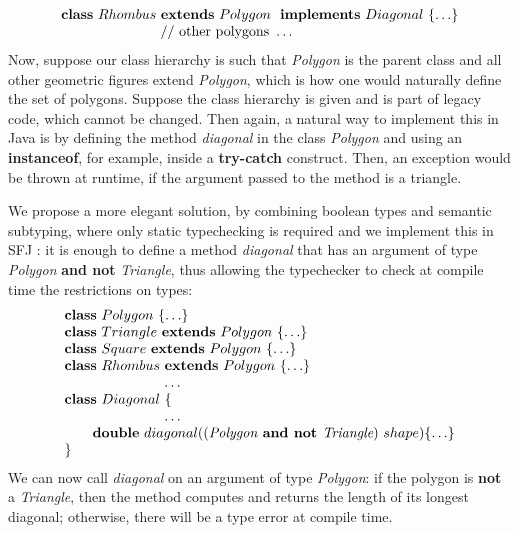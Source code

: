 \documentclass[runningheads]{llncs}
\begin{document}
\begin{example}[Polygons]
\begin{equation*}
\begin{array}{l}
            \mathbf{class} \  Rhombus \ \mathbf{extends }\  Polygon\  \ \mathbf{implements}\  Diagonal \ \{\ldots\}
            \\
            \hspace{2.5cm} // \text{ other polygons } \ldots
        \end{array}
    \end{equation*}
    Now, suppose our class hierarchy is such that \emph{Polygon} is the parent class and all other geometric figures extend \emph{Polygon}, which is how one would naturally define the set of polygons.
    Suppose the class hierarchy is given and is part of legacy code, which cannot be changed.
    Then again, a natural way to implement this in Java is by defining the method \emph{diagonal} in the class \emph{Polygon} and using an \textbf{instanceof}, for example, inside a \textbf{try-catch} construct.
    Then, an exception would be thrown at runtime, if the argument passed to the method is a triangle.

    We propose a more elegant solution, by combining boolean types and semantic subtyping, where only static typechecking is required and we implement this in SFJ \cite{UD20}: it is enough to define a method \emph{diagonal} that has an argument of type \emph{Polygon} \textbf{and not} \emph{Triangle}, thus allowing the typechecker to check at compile time the restrictions on types:
    \begin{equation*}
        \begin{array}{l}
            \mathbf{class} \  Polygon \ \{\ldots\}
            \\
            \mathbf{class} \  Triangle \ \mathbf{extends }\  Polygon\ \{\ldots\}
            \\
            \mathbf{class} \  Square \ \mathbf{extends }\  Polygon\ \{\ldots\}
            \\
            \mathbf{class} \  Rhombus \ \mathbf{extends }\  Polygon\ \{\ldots\}
            \\
            \hspace{2.5cm} \ldots
            \\
            \mathbf{class} \  Diagonal \ \{
            \\
            \hspace{2.5cm} \ldots \\
            \qquad \mathbf{double}\ diagonal((\textit{Polygon} \textbf{ and not }  \textit{Triangle}) \ shape)\{\ldots\}
            \\
            \}
        \end{array}
    \end{equation*}
    We can now call \emph{diagonal} on an argument of type \emph{Polygon}: if the polygon is \textbf{not} a \emph{Triangle}, then the method computes and returns the length of its longest diagonal; otherwise, there will be a type error at compile time.
\end{example}
\end{document}
